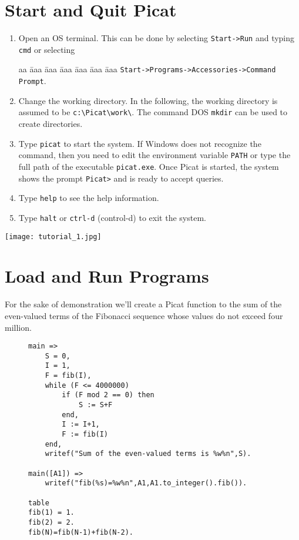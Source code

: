 \documentclass{article}[12pt]
\begin{document}
\section*{\Large{Start and Quit Picat}}
\begin{enumerate}
\item Open an OS terminal. This can be done by selecting \verb+Start->Run+ and typing \verb+cmd+ or selecting 
\begin{tabbing}
aa \= aaa \= aaa \= aaa \= aaa \= aaa \= aaa \kill
\> \> \verb+Start->Programs->Accessories->Command Prompt+.  
\end{tabbing}

\item Change the working directory. In the following, the working directory is assumed to be \verb+c:\Picat\work\+. The command DOS \texttt{mkdir} can be used to create directories.

\item Type \verb+picat+ to start the system. If Windows does not recognize the command, then you need to edit the environment variable \texttt{PATH} or type the full path of the executable \verb+picat.exe+. Once Picat is started, the system shows the prompt \verb+Picat>+ and is ready to accept queries.

\item Type \texttt{help} to see the help information.

\item Type \texttt{halt} or \verb+ctrl-d+ (control-d) to exit the system.
\end{enumerate}

\texttt{[image: tutorial\_1.jpg]}

\section*{\Large{Load and Run Programs}} 
\indent For the sake of demonstration we'll create a Picat function to the sum of the
even-valued terms of the Fibonacci sequence whose values do not exceed four million.

\begin{figure}[htb]
\begin{verbatim} 
main =>
    S = 0,
    I = 1,
    F = fib(I),
    while (F <= 4000000)
        if (F mod 2 == 0) then
            S := S+F
        end,
        I := I+1,
        F := fib(I)
    end,
    writef("Sum of the even-valued terms is %w%n",S).
       
main([A1]) => 
    writef("fib(%s)=%w%n",A1,A1.to_integer().fib()).

table
fib(1) = 1.
fib(2) = 2.
fib(N)=fib(N-1)+fib(N-2).
\end{verbatim}
\end{figure}
\vspace*{-5mm}
\end{document}
